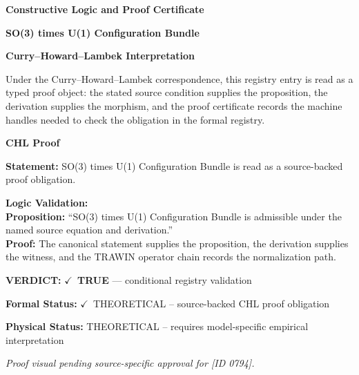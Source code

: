 \clearpage
\begingroup\tzpsupportsetup
\noindent\textbf{\fontsize{10.8pt}{12.8pt}\selectfont [ID 0794] Constructive Logic and Proof Certificate}\par
\noindent\textbf{\fontsize{10pt}{12pt}\selectfont SO(3) times U(1) Configuration Bundle}\par
\vspace{0.45em}
\begingroup
\footnotesize
\setlength{\parskip}{0.22em}
\setlength{\parindent}{0pt}
\noindent\textbf{Curry--Howard--Lambek Interpretation}\par
Under the Curry--Howard--Lambek correspondence, this registry entry is read as a typed proof
object: the stated source condition supplies the proposition, the derivation supplies the
morphism, and the proof certificate records the machine handles needed to check the obligation
in the formal registry.

\vspace{0.45em}
\noindent\textbf{CHL Proof}\par
\textbf{Statement:} SO(3) times U(1) Configuration Bundle is read as a source-backed proof obligation.

\textbf{Logic Validation:}\\
\textbf{Proposition:} ``SO(3) times U(1) Configuration Bundle is admissible under the named source equation and derivation.''\\
\textbf{Proof:} The canonical statement supplies the proposition, the derivation supplies the witness, and the TRAWIN operator chain records the normalization path.

\textbf{VERDICT:} \ensuremath{\checkmark}\ \textbf{TRUE} --- conditional registry validation

\textbf{Formal Status:} \ensuremath{\checkmark}\ THEORETICAL -- source-backed CHL proof obligation

\textbf{Physical Status:} THEORETICAL -- requires model-specific empirical interpretation
\par\vspace{0.45em}
\par
\vfill
\begingroup\footnotesize\itshape
Proof visual pending source-specific approval for [ID 0794].
\par\endgroup
\vfill
\endgroup
\endgroup
